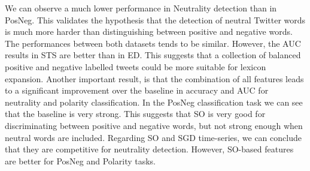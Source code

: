 \documentclass{sig-alternate}
\begin{document}
We can observe a much lower performance in Neutrality detection than in PosNeg. This validates the hypothesis that the detection of neutral Twitter words is much more harder than distinguishing between positive and negative words.  
The performances between both datasets tends to be similar. However, the AUC results in STS are better than in ED. This suggests that a collection of balanced positive and negative labelled tweets could be more suitable for lexicon expansion. 
Another important result, is that the combination of all features leads to a significant improvement over the baseline in accuracy and AUC for neutrality and polarity classification. In the PosNeg classification task we can see that the baseline is very strong. This suggests that SO is very good for discriminating between positive and negative words, but not strong enough when neutral words are included.
Regarding SO and SGD time-series, we can conclude that they are competitive for neutrality detection. However, SO-based features are better for PosNeg and Polarity tasks. 
\end{document}
